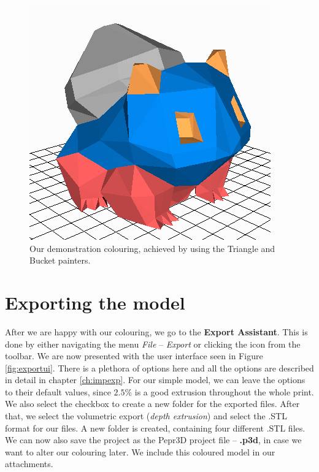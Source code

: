\begin{figure}
	\centering
	\includegraphics[scale=1]{images/result.png}
	\caption{Our demonstration colouring, achieved by using the Triangle and Bucket painters.}
	\label{fig:painted}
\end{figure}

\section{Exporting the model}

After we are happy with our colouring, we go to the \textbf{Export Assistant}.
This is done by either navigating the menu \textit{File} -- \textit{Export} or clicking the icon from the toolbar.
We are now presented with the user interface seen in Figure \ref{fig:exportui}.
There is a plethora of options here and all the options are described in detail in chapter \ref{ch:impexp}.
For our simple model, we can leave the options to their default values, since $2.5\%$ is a good extrusion throughout the whole print. We also select the checkbox to create a new folder for the exported files.
After that, we select the volumetric export (\textit{depth extrusion}) and select the .STL format for our files.
A new folder is created, containing four different .STL files.
We can now also save the project as the Pepr3D project file -- \textbf{.p3d}, in case we want to alter our colouring later.
We include this coloured model in our attachments.

